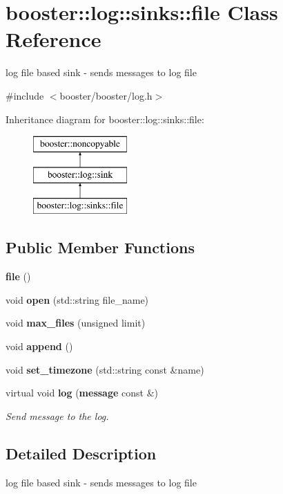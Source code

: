 \section{booster\-:\-:log\-:\-:sinks\-:\-:file Class Reference}
\label{classbooster_1_1log_1_1sinks_1_1file}


log file based sink -\/ sends messages to log file  




{\ttfamily \#include $<$booster/booster/log.\-h$>$}

Inheritance diagram for booster\-:\-:log\-:\-:sinks\-:\-:file\-:\begin{figure}[H]
\begin{center}
\leavevmode
\includegraphics[height=3.000000cm]{classbooster_1_1log_1_1sinks_1_1file}
\end{center}
\end{figure}
\subsection*{Public Member Functions}
\begin{DoxyCompactItemize}
\item 
{\bf file} ()
\item 
void {\bf open} (std\-::string file\-\_\-name)
\item 
void {\bf max\-\_\-files} (unsigned limit)
\item 
void {\bf append} ()
\item 
void {\bf set\-\_\-timezone} (std\-::string const \&name)
\item 
virtual void {\bf log} ({\bf message} const \&)\label{classbooster_1_1log_1_1sinks_1_1file_ad2a5335abaff993da082fb124056748a}

\begin{DoxyCompactList}\small\item\em Send message to the log. \end{DoxyCompactList}\end{DoxyCompactItemize}


\subsection{Detailed Description}
log file based sink -\/ sends messages to log file 

